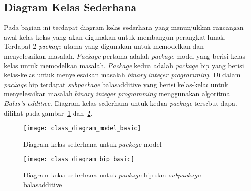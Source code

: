 \subsection{Diagram Kelas Sederhana}
\label{subsec:diagram_kelas_sederhana}
Pada bagian ini terdapat diagram kelas sederhana yang menunjukkan rancangan awal kelas-kelas yang akan digunakan untuk membangun perangkat lunak. Terdapat 2 \textit{package} utama yang digunakan untuk memodelkan dan menyelesaikan masalah. \textit{Package} pertama adalah \textit{package} model yang berisi kelas-kelas untuk memodelkan masalah. \textit{Package} kedua adalah \textit{package} bip yang berisi kelas-kelas untuk menyelesaikan masalah \textit{binary integer programming}. Di dalam \textit{package} bip terdapat \textit{subpackage} balasadditive yang berisi kelas-kelas untuk menyelesaikan masalah \textit{binary integer programming} menggunakan algoritma \textit{Balas's additive}. Diagram kelas sederhana untuk kedua \textit{package} tersebut dapat dilihat pada gambar~\ref{fig:class_diagram_model_basic} dan~\ref{fig:class_diagram_bip_basic}.

\begin{figure}[h]
	\centering  
	\texttt{[image: class\_diagram\_model\_basic]}
	\caption[Diagram kelas sederhana untuk \textit{package} model]{Diagram kelas sederhana untuk \textit{package} model}
	\label{fig:class_diagram_model_basic}
\end{figure}

\begin{figure}[h]
	\centering  
	\texttt{[image: class\_diagram\_bip\_basic]}
	\caption[Diagram kelas sederhana untuk \textit{package} bip dan \textit{subpackage} balasadditive]{Diagram kelas sederhana untuk \textit{package} bip dan \textit{subpackage} balasadditive}
	\label{fig:class_diagram_bip_basic}
\end{figure}